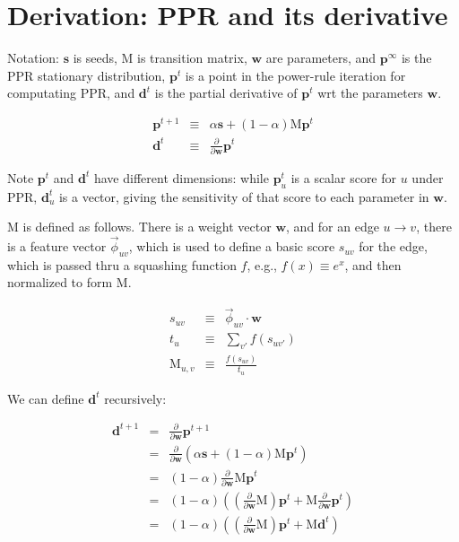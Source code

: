 \documentclass[12pt]{article}
\newcommand{\edge}[2]{{u\rightarrow{}v}}
\newcommand{\edgeuv}{{\edge{u}{v}}}
\newcommand{\vek}[1]{\textbf{#1}}
\newcommand{\ddw}{\frac{\partial}{\partial\vek{w}}}
\newcommand{\M}{\textrm{M}}
\newcommand{\vphi}{\vec{\phi}}
\begin{document}
\section{Derivation: PPR and its derivative}

Notation: $\vek{s}$ is seeds, $\M$ is transition matrix, $\vek{w}$ are
parameters, and $\vek{p}^\infty$ is the PPR stationary distribution,
$\vek{p}^t$ is a point in the power-rule iteration for computating
PPR, and $\vek{d}^t$ is the partial derivative of $\vek{p}^t$ wrt the
parameters $\vek{w}$.

\begin{eqnarray}
\vek{p}^{t+1} & \equiv & \alpha \vek{s} + (1-\alpha) \M \vek{p}^t \\
\vek{d}^t & \equiv &  \ddw \vek{p}^t
\end{eqnarray}

Note $\vek{p}^t$ and $\vek{d}^t$ have different dimensions: while
$\vek{p}^t_u$ is a scalar score for $u$ under PPR, $\vek{d}^t_u$ is a
vector, giving the sensitivity of that score to each parameter in
$\vek{w}$.

$\M$ is defined as follows.  There is a weight vector $\vek{w}$, and
for an edge $\edgeuv$, there is a feature vector $\vphi_{uv}$, which is
used to define a basic score $s_{uv}$ for the edge, which is passed
thru a squashing function $f$, e.g., $f(x)\equiv e^x$, and then
normalized to form $\M$.

\begin{eqnarray}
 s_{uv}   & \equiv & \vphi_{uv} \cdot \vek{w}  \\
 t_u      & \equiv & \sum_{v'} f(s_{uv'}) \\
 \M_{u,v} & \equiv & \frac{ f(s_{uv}) }{ t_u }
\end{eqnarray}

We can define $\vek{d}^t$ recursively:


\begin{eqnarray}
\vek{d}^{t+1}  & =  &  \ddw \vek{p}^{t+1} \\
               & =  &  \ddw \left( \alpha \vek{s} + (1-\alpha) \M \vek{p}^t \right) \\
               & =  &  (1-\alpha) \ddw \M \vek{p}^t \\
               & =  &  (1-\alpha) \left( (\ddw \M) \vek{p}^t  + \M \ddw\vek{p}^t \right) \\
               & =  &  (1-\alpha) \left( (\ddw \M) \vek{p}^t  + \M \vek{d}^t \right)
\end{eqnarray}
\end{document}
